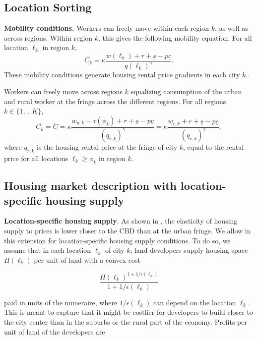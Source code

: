 \documentclass[11pt]{report}
\begin{document}
\subsection{Location Sorting}\label{B-sec:sorting} 

\textbf{Mobility conditions.} Workers can freely move within each region $k$, as well as across regions. Within region $k$, this gives the following mobility equation. For all location $\ell_k$ in region $k$,
\begin{equation}
\overline{C_k}=\kappa\frac{w(\ell_k)+r+ \underline{s}-p\underline{c}}{q(\ell_k)^{\gamma}}. \label{B-eq:log-indiff-withink}
\end{equation}
These mobility conditions generate housing rental price gradients in each city $k$..

Workers can freely move across regions $k$ equalizing consumption of the urban and rural worker at the fringe across the different regions. For all regions $k \in \{1,...K\}$,
\begin{equation}
\overline{C_k}=\overline{C}=\kappa\frac{w_{u,k}-\tau(\phi_k) + r + \underline{s} -p\underline{c}}{(q_{r,k})^{\gamma}}=\kappa\frac{w_{r,k}+r+ \underline{s}-p\underline{c}}{(q_{r,k})^{\gamma}},
\label{B-eq:log-indiff-acrossk}
\end{equation}
where $q_{r,k}$ is the housing rental price at the fringe of city $k$, equal to the rental price for all locations $\ell_k \geq \phi_k$ in region $k$.

\subsection{Housing market description with location-specific housing supply}\label{B-sec:extensions-epsilon-loc} 

\noindent \textbf{Location-specific housing supply}. As shown in \cite{baumsnowhan2020}, the elasticity of housing supply to prices is lower closer to the CBD than at the urban fringe. We allow in this extension for location-specific housing supply conditions. To do so, we assume that in each location $\ell_k$ of city $k$, land developers supply housing space $H(\ell_k)$ per unit of land with a convex cost

$$\frac{H(\ell_k)^{1+1/\epsilon(\ell_k)}}{1+1/\epsilon(\ell_k)}$$

paid in units of the numeraire, where $1/\epsilon(\ell_k)$ can depend on the location $\ell_k$. This is meant to capture that it might be costlier for developers to build closer to the city center than in the suburbs or the rural part of the economy. Profits per unit of land of the developers are
\end{document}
